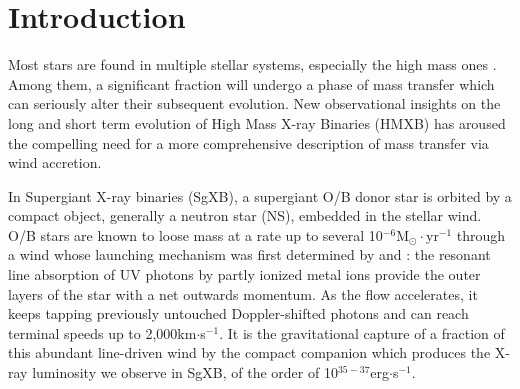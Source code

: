 \documentclass{aa}
\makeatletter
\newcommand{\sgx}{SgXB\xspace}
\newcommand*{\hmxb}{HMXB\@\xspace}
\newcommand*{\rlof}{RLOF\@\xspace}
\newcommand*{\ns}{NS\@\xspace}
\makeatother
\begin{document}
\section{Introduction}

Most stars are found in multiple stellar systems, especially the high mass ones \citep{Duchene2013}. Among them, a significant fraction will undergo a phase of mass transfer which can seriously alter their subsequent evolution. New observational insights on the long \citep{Abbott2016a} and short term \citep{Grinberg2017} evolution of High Mass X-ray Binaries (\hmxb) has aroused the compelling need for a more comprehensive description of mass transfer via wind accretion. 


In Supergiant X-ray binaries (\sgx), a supergiant O/B donor star is orbited by a compact object, generally a neutron star (\ns), embedded in the stellar wind. O/B stars are known to loose mass at a rate up to several 10$^{-6}$M$_{\odot}\cdot$yr$^{-1}$ through a wind whose launching mechanism was first determined by \cite{Lucy1970} and \cite{Castor1975} : the resonant line absorption of UV photons by partly ionized metal ions provide the outer layers of the star with a net outwards momentum. As the flow accelerates, it keeps tapping previously untouched Doppler-shifted photons and can reach terminal speeds up to 2,000km$\cdot$s$^{-1}$. It is the gravitational capture of a fraction of this abundant line-driven wind by the compact companion which produces the X-ray luminosity we observe in \sgx, of the order of 10$^{35-37}$erg$\cdot$s$^{-1}$.
\end{document}
